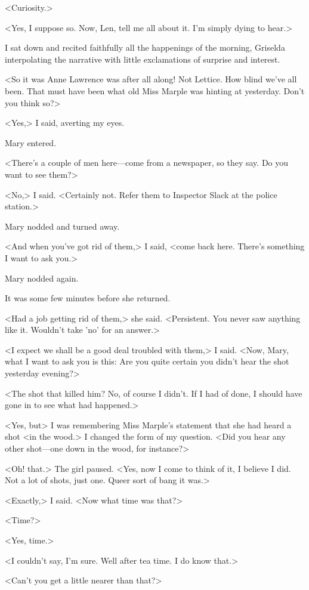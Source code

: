 <Curiosity.>

<Yes, I suppose so. Now, Len, tell me all about it. I'm simply dying to hear.>

I sat down and recited faithfully all the happenings of the morning, Griselda interpolating the narrative with little exclamations of surprise and interest.

<So it was Anne Lawrence was after all along! Not Lettice. How blind we've all been. That must have been what old Miss Marple was hinting at yesterday. Don't you think so?>

<Yes,> I said, averting my eyes.

Mary entered.

<There's a couple of men here—come from a newspaper, so they say. Do you want to see them?>

<No,> I said. <Certainly not. Refer them to Inspector Slack at the police station.>

Mary nodded and turned away.

<And when you've got rid of them,> I said, <come back here. There's something I want to ask you.>

Mary nodded again.

It was some few minutes before she returned.

<Had a job getting rid of them,> she said. <Persistent. You never saw anything like it. Wouldn't take 'no' for an answer.>

<I expect we shall be a good deal troubled with them,> I said. <Now, Mary, what I want to ask you is this: Are you quite certain you didn't hear the shot yesterday evening?>

<The shot that killed him? No, of course I didn't. If I had of done, I should have gone in to see what had happened.>

<Yes, but\longdash> I was remembering Miss Marple's statement that she had heard a shot <in the wood.> I changed the form of my question. <Did you hear any other shot—one down in the wood, for instance?>

<Oh! that.> The girl paused. <Yes, now I come to think of it, I believe I did. Not a lot of shots, just one. Queer sort of bang it was.>

<Exactly,> I said. <Now what time was that?>

<Time?>

<Yes, time.>

<I couldn't say, I'm sure. Well after tea time. I do know that.>

<Can't you get a little nearer than that?>

